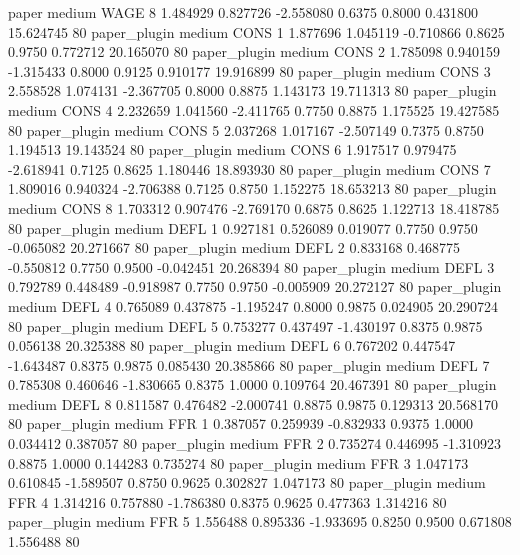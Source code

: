          paper     medium     WAGE                 8  1.484929 0.827726 -2.558080 0.6375 0.8000  0.431800   15.624745 80
  paper_plugin     medium     CONS                 1  1.877696 1.045119 -0.710866 0.8625 0.9750  0.772712   20.165070 80
  paper_plugin     medium     CONS                 2  1.785098 0.940159 -1.315433 0.8000 0.9125  0.910177   19.916899 80
  paper_plugin     medium     CONS                 3  2.558528 1.074131 -2.367705 0.8000 0.8875  1.143173   19.711313 80
  paper_plugin     medium     CONS                 4  2.232659 1.041560 -2.411765 0.7750 0.8875  1.175525   19.427585 80
  paper_plugin     medium     CONS                 5  2.037268 1.017167 -2.507149 0.7375 0.8750  1.194513   19.143524 80
  paper_plugin     medium     CONS                 6  1.917517 0.979475 -2.618941 0.7125 0.8625  1.180446   18.893930 80
  paper_plugin     medium     CONS                 7  1.809016 0.940324 -2.706388 0.7125 0.8750  1.152275   18.653213 80
  paper_plugin     medium     CONS                 8  1.703312 0.907476 -2.769170 0.6875 0.8625  1.122713   18.418785 80
  paper_plugin     medium     DEFL                 1  0.927181 0.526089  0.019077 0.7750 0.9750 -0.065082   20.271667 80
  paper_plugin     medium     DEFL                 2  0.833168 0.468775 -0.550812 0.7750 0.9500 -0.042451   20.268394 80
  paper_plugin     medium     DEFL                 3  0.792789 0.448489 -0.918987 0.7750 0.9750 -0.005909   20.272127 80
  paper_plugin     medium     DEFL                 4  0.765089 0.437875 -1.195247 0.8000 0.9875  0.024905   20.290724 80
  paper_plugin     medium     DEFL                 5  0.753277 0.437497 -1.430197 0.8375 0.9875  0.056138   20.325388 80
  paper_plugin     medium     DEFL                 6  0.767202 0.447547 -1.643487 0.8375 0.9875  0.085430   20.385866 80
  paper_plugin     medium     DEFL                 7  0.785308 0.460646 -1.830665 0.8375 1.0000  0.109764   20.467391 80
  paper_plugin     medium     DEFL                 8  0.811587 0.476482 -2.000741 0.8875 0.9875  0.129313   20.568170 80
  paper_plugin     medium      FFR                 1  0.387057 0.259939 -0.832933 0.9375 1.0000  0.034412    0.387057 80
  paper_plugin     medium      FFR                 2  0.735274 0.446995 -1.310923 0.8875 1.0000  0.144283    0.735274 80
  paper_plugin     medium      FFR                 3  1.047173 0.610845 -1.589507 0.8750 0.9625  0.302827    1.047173 80
  paper_plugin     medium      FFR                 4  1.314216 0.757880 -1.786380 0.8375 0.9625  0.477363    1.314216 80
  paper_plugin     medium      FFR                 5  1.556488 0.895336 -1.933695 0.8250 0.9500  0.671808    1.556488 80
